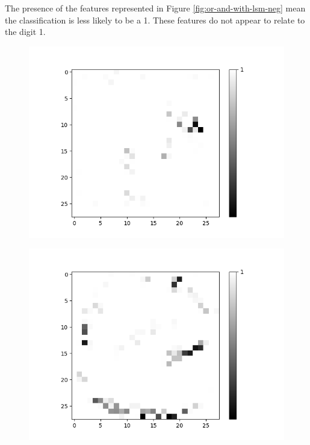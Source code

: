 \noindent
\begin{minipage}[t]{0.5\textwidth}
	\vspace{0px}
	The presence of the features represented in Figure \ref{fig:or-and-with-lsm-neg} mean the classification is less likely to be a 1. These features do not appear to relate to the digit 1.\\
		
	\begin{figure}[H]	
		\centering
		\begin{minipage}[b]{0.32\textwidth}
			\captionsetup{labelformat=empty}
			\includegraphics[width=\textwidth]{OR-AND(W-LSM)(1)/DontLike/True/Layer0-Neuron-2.png}
			\label{}
		\end{minipage}
		\begin{minipage}[b]{0.32\textwidth}
			\captionsetup{labelformat=empty}
			\includegraphics[width=\textwidth]{OR-AND(W-LSM)(1)/DontLike/True/Layer0-Neuron-9.png}

\end{minipage}
\end{figure}
\end{minipage}
